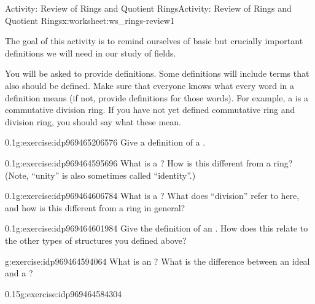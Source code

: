 \documentclass[11pt]{book}
\begin{document}
%
%
\typeout{************************************************}
\typeout{************************************************}
%
\begin{worksheet-subsection}{Activity: Review of Rings and Quotient Rings}{}{Activity: Review of Rings and Quotient Rings}{}{}{x:worksheet:ws_rings-review1}
\begin{introduction}{}%
The goal of this activity is to remind ourselves of basic but crucially important definitions we will need in our study of fields.%
\par
You will be asked to provide definitions. Some definitions will include terms that also should be defined.  Make sure that everyone knows what every word in a definition means (if not, provide definitions for those words).  For example, a  is a commutative division ring.  If you have not yet defined commutative ring and division ring, you should say what these mean.%
\end{introduction}%
\begin{divisionexercise}{1}{}{0.1}{g:exercise:idp969465206576}%
Give a definition of a .%
\end{divisionexercise}%
\begin{divisionexercise}{2}{}{0.1}{g:exercise:idp969464595696}%
What is a ?  How is this different from a ring?  (Note, ``unity'' is also sometimes called ``identity''.)%
\end{divisionexercise}%
\begin{divisionexercise}{3}{}{0.1}{g:exercise:idp969464606784}%
What is a ?  What does ``division'' refer to here, and how is this different from a ring in general?%
\end{divisionexercise}%
\begin{divisionexercise}{4}{}{0.1}{g:exercise:idp969464601984}%
Give the definition of an .  How does this relate to the other types of structures you defined above?%
\end{divisionexercise}%
\begin{divisionexercise}{5}{}{}{g:exercise:idp969464594064}%
What is an ?  What is the difference between an ideal and a ?%
\end{divisionexercise}%
\clearpage
\begin{divisionexercise}{6}{}{0.15}{g:exercise:idp969464584304}%

\end{divisionexercise}
\end{worksheet-subsection}
\end{document}
